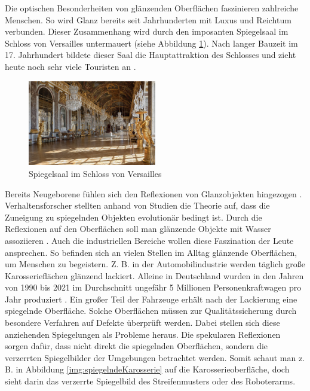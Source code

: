 Die optischen Besonderheiten von glänzenden Oberflächen faszinieren zahlreiche Menschen.
So wird Glanz bereits seit Jahrhunderten mit Luxus und Reichtum verbunden.
Dieser Zusammenhang wird durch den imposanten Spiegelsaal im Schloss von Versailles untermauert (siehe Abbildung \ref{img:spiegelSaal}).
Nach langer Bauzeit im 17. Jahrhundert bildete dieser Saal die Hauptattraktion des Schlosses und zieht heute noch sehr viele Touristen an \cite{versailles}.

{
	\begin{figure}[H]
		\centering
		\includegraphics[width=0.5\textwidth]{01_einfuehrung/figures/spiegelSaal}
		\caption[Spiegelsaal im Schloss von Versailles]{Spiegelsaal im Schloss von Versailles}
		\label{img:spiegelSaal}
	\end{figure}
}

\noindent
Bereits Neugeborene fühlen sich den Reflexionen von Glanzobjekten hingezogen \cite{shinyObjects}.
Verhaltensforscher stellten anhand von Studien die Theorie auf, dass die Zuneigung zu spiegelnden Objekten evolutionär bedingt ist.
Durch die Reflexionen auf den Oberflächen soll man glänzende Objekte mit Wasser assoziieren \cite{waterAndShininess}.
Auch die industriellen Bereiche wollen diese Faszination der Leute ansprechen.
So befinden sich an vielen Stellen im Alltag glänzende Oberflächen, um Menschen zu begeistern.
Z. B. in der Automobilindustrie werden täglich große Karosserieflächen glänzend lackiert.
Alleine in Deutschland wurden in den Jahren von 1990 bis 2021 im Durchschnitt ungefähr 5 Millionen Personenkraftwagen pro Jahr produziert \cite{statistaPKW}.
Ein großer Teil der Fahrzeuge erhält nach der Lackierung eine spiegelnde Oberfläche.
Solche Oberflächen müssen zur Qualitätssicherung durch besondere Verfahren auf Defekte überprüft werden.
Dabei stellen sich diese anziehenden Spiegelungen als Probleme heraus.
Die spekularen Reflexionen sorgen dafür, dass nicht direkt die spiegelnden Oberflächen, sondern die verzerrten Spiegelbilder der Umgebungen betrachtet werden.
Somit schaut man z. B. in Abbildung \ref{img:spiegelndeKarosserie} auf die Karosserieoberfläche, doch sieht darin das verzerrte Spiegelbild des Streifenmusters oder des Roboterarms.

